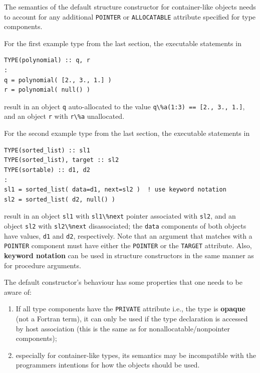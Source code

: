 \documentclass[
  paper=a4,
  ,captions=tableheading
]{scrartcl}
\newcommand{\passthrough}[1]{#1}
\providecommand{\tightlist}{%
  \setlength{\itemsep}{0pt}\setlength{\parskip}{0pt}}
\begin{document}
The semantics of the default structure constructor for container-like
objects needs to account for any additional
\passthrough{\lstinline!POINTER!} or
\passthrough{\lstinline!ALLOCATABLE!} attribute specified for type
components.

For the first example type from the last section, the executable
statements in

\begin{lstlisting}
TYPE(polynomial) :: q, r
:
q = polynomial( [2., 3., 1.] )
r = polynomial( null() )
\end{lstlisting}

result in an object \passthrough{\lstinline!q!} auto-allocated to the
value \passthrough{\lstinline!q\%a(1:3) == [2., 3., 1.]!}, and an object
\passthrough{\lstinline!r!} with \passthrough{\lstinline!r\%a!}
unallocated.

For the second example type from the last section, the executable
statements in

\begin{lstlisting}
TYPE(sorted_list) :: sl1
TYPE(sorted_list), target :: sl2
TYPE(sortable) :: d1, d2
:
sl1 = sorted_list( data=d1, next=sl2 )  ! use keyword notation
sl2 = sorted_list( d2, null() )
\end{lstlisting}

result in an object \passthrough{\lstinline!sl1!} with
\passthrough{\lstinline!sl1\%next!} pointer associated with
\passthrough{\lstinline!sl2!}, and an object
\passthrough{\lstinline!sl2!} with \passthrough{\lstinline!sl2\%next!}
disassociated; the \passthrough{\lstinline!data!} components of both
objects have values, \passthrough{\lstinline!d1!} and
\passthrough{\lstinline!d2!}, respectively. Note that an argument that
matches with a \passthrough{\lstinline!POINTER!} component must have
either the \passthrough{\lstinline!POINTER!} or the
\passthrough{\lstinline!TARGET!} attribute. Also, \textbf{keyword
notation} can be used in structure constructors in the same manner as
for procedure arguments.

The default constructor's behaviour has some properties that one needs
to be aware of:

\begin{enumerate}
\def\labelenumi{\arabic{enumi}.}
\tightlist
\item
  If all type components have the \passthrough{\lstinline!PRIVATE!}
  attribute i.e., the type is \textbf{opaque} (not a Fortran term), it
  can only be used if the type declaration is accessed by host
  association (this is the same as for nonallocatable/nonpointer
  components);
\item
  especially for container-like types, its semantics may be incompatible
  with the programmers intentions for how the objects should be used.
\end{enumerate}
\end{document}
